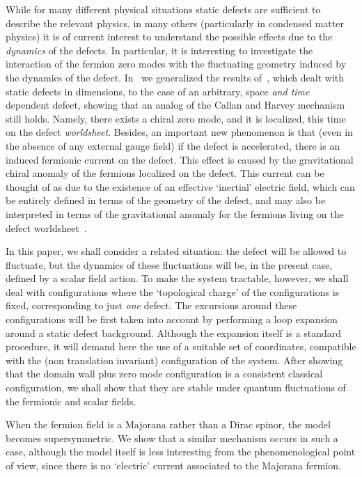 \documentclass[a4paper,12pt]{article}
\begin{document}
While for many different physical situations static defects are
sufficient to describe the relevant physics, in many others
(particularly in condensed matter physics) it is of current interest
to understand the possible effects due to the {\em dynamics\/} of the
defects. In particular, it is interesting to investigate the
interaction of the fermion zero modes with the fluctuating geometry
induced by the dynamics of the defect.  In~\cite{ffl} we generalized
the results of~\cite{fl}, which dealt with static defects in \coordHE{}
dimensions, to the case of an arbitrary, space {\em and time\/}
dependent defect, showing that an analog of the Callan and Harvey
mechanism~\cite{callan} still holds. Namely, there exists a chiral
zero mode, and it is localized, this time on the defect {\em
  worldsheet}.  Besides, an important new phenomenon is that (even
in the absence of any external gauge field) if the defect is
accelerated, there is an induced fermionic current on the defect. This
effect is caused by the gravitational chiral anomaly of the fermions
localized on the defect.  This current can be thought of as due to the
existence of an effective `inertial' electric field, which can be
entirely defined in terms of the geometry of the defect, and may also
be interpreted in terms of the gravitational anomaly for the fermions
living on the defect worldsheet~\cite{kks}.

In this paper, we shall consider a related situation: the defect will
be allowed to fluctuate, but the dynamics of these fluctuations will
be, in the present case, defined by a scalar field action.  To make
the system tractable, however, we shall deal with configurations where
the `topological charge' of the configurations is fixed, corresponding
to just {\em one\/} defect.  The excursions around these
configurations will be first taken into account by performing a loop
expansion around a static defect background.  Although the expansion
itself is a standard procedure, it will demand here the use of a
suitable set of coordinates, compatible with the (non translation
invariant) configuration of the system. After showing that the domain
wall plus zero mode configuration is a consistent classical
configuration, we shall show that they are stable under quantum
fluctuations of the fermionic and scalar fields.

When the fermion field is a Majorana rather than a Dirac spinor, the model
becomes supersymmetric. We show that a similar mechanism occurs in
such a case, although the model itself is less interesting from the
phenomenological point of view, since there is no `electric' current 
associated to the Majorana fermion.
\end{document}
